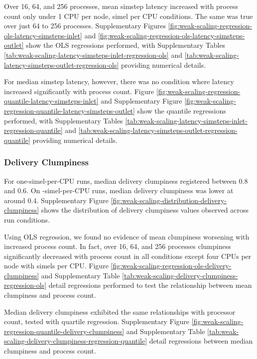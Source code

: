 Over 16, 64, and 256 processes, mean simstep latency increased with process count only under 1 CPU per node,  simel per CPU conditions.
The same was true over just 64 to 256 processes.
Supplementary Figures \ref{fig:weak-scaling-regression-ols-latency-simsteps-inlet} and \ref{fig:weak-scaling-regression-ols-latency-simsteps-outlet} show the OLS regressions performed, with
Supplementary Tables \ref{tab:weak-scaling-latency-simsteps-inlet-regression-ols} and \ref{tab:weak-scaling-latency-simsteps-outlet-regression-ols} providing numerical details.



For median simstep latency, however, there was no condition where latency increased significantly with process count.
Figure \ref{fig:weak-scaling-regression-quantile-latency-simsteps-inlet} and Supplementary Figure \ref{fig:weak-scaling-regression-quantile-latency-simsteps-outlet} show the quantile regressions performed, with Supplementary Tables \ref{tab:weak-scaling-latency-simsteps-inlet-regression-quantile} and \ref{tab:weak-scaling-latency-simsteps-outlet-regression-quantile} providing numerical details.

\subsubsection{Delivery Clumpiness}

For one-simel-per-CPU runs, median delivery clumpiness registered between 0.8 and 0.6.
On -simel-per-CPU runs, median delivery clumpiness was lower at around 0.4.
Supplementary Figure \ref{fig:weak-scaling-distribution-delivery-clumpiness}
shows the distribution of delivery clumpiness values observed across run conditions.



Using OLS regression, we found no evidence of mean clumpiness worsening with increased process count.
In fact, over 16, 64, and 256 processes clumpiness significantly decreased with process count in all conditions except four CPUs per node with  simels per CPU.
Figure \ref{fig:weak-scaling-regression-ols-delivery-clumpiness} and Supplementary Table \ref{tab:weak-scaling-delivery-clumpiness-regression-ols} detail regressions performed to test the relationship between mean clumpiness and process count.

Median delivery clumpiness exhibited the same relationships with processor count, tested with quartile regression.
Supplementary Figure \ref{fig:weak-scaling-regression-quantile-delivery-clumpiness} and Supplementary Table \ref{tab:weak-scaling-delivery-clumpiness-regression-quantile} detail regressions between median clumpiness and process count.

